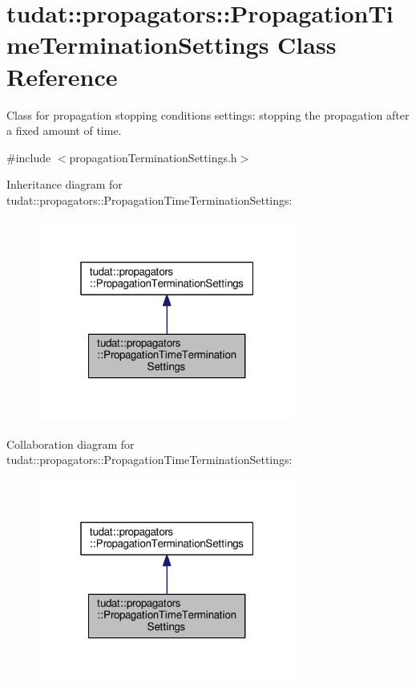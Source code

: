 \hypertarget{classtudat_1_1propagators_1_1PropagationTimeTerminationSettings}{}\section{tudat\+:\+:propagators\+:\+:Propagation\+Time\+Termination\+Settings Class Reference}
\label{classtudat_1_1propagators_1_1PropagationTimeTerminationSettings}


Class for propagation stopping conditions settings\+: stopping the propagation after a fixed amount of time.  




{\ttfamily \#include $<$propagation\+Termination\+Settings.\+h$>$}



Inheritance diagram for tudat\+:\+:propagators\+:\+:Propagation\+Time\+Termination\+Settings\+:
\nopagebreak
\begin{figure}[H]
\begin{center}
\leavevmode
\includegraphics[width=241pt]{classtudat_1_1propagators_1_1PropagationTimeTerminationSettings__inherit__graph}
\end{center}
\end{figure}


Collaboration diagram for tudat\+:\+:propagators\+:\+:Propagation\+Time\+Termination\+Settings\+:
\nopagebreak
\begin{figure}[H]
\begin{center}
\leavevmode
\includegraphics[width=241pt]{classtudat_1_1propagators_1_1PropagationTimeTerminationSettings__coll__graph}
\end{center}
\end{figure}
